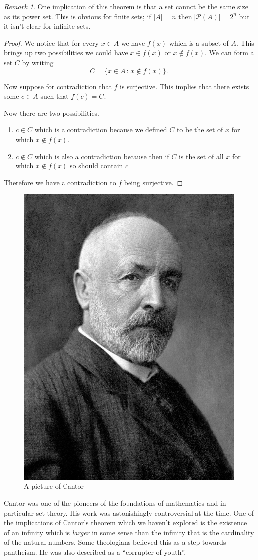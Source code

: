 \documentclass[
]{book}
\theoremstyle{definition}
\theoremstyle{definition}
\theoremstyle{definition}
\theoremstyle{definition}
\theoremstyle{remark}
\newtheorem*{remark}{Remark}
\begin{document}
\begin{remark}
One implication of this theorem is that a set cannot be the same size as its power set. This is obvious for finite sets; if \(|A|=n\) then \(|\mathcal{P}(A)|= 2^n\) but it isn't clear for infinite sets.
\end{remark}

\begin{proof}
We notice that for every \(x \in A\) we have \(f(x)\) which is a subset of \(A\). This brings up two possibilities we could have \(x \in f(x)\) or \(x \notin f(x)\). We can form a set \(C\) by writing
\[ C = \{ x \in A\,:\, x \notin f(x)\}.  \]

Now suppose for contradiction that \(f\) is surjective. This implies that there exists some \(c \in A\) such that \(f(c) = C\).

Now there are two possibilities.

\begin{enumerate}
\def\labelenumi{\arabic{enumi}.}
\item
  \(c \in C\) which is a contradiction because we defined \(C\) to be the set of \(x\) for which \(x \notin f(x)\).
\item
  \(c \notin C\) which is also a contradiction because then if \(C\) is the set of all \(x\) for which \(x \notin f(x)\) so should contain \(c\).
\end{enumerate}

Therefore we have a contradiction to \(f\) being surjective.
\end{proof}

\begin{figure}
\includegraphics[width=0.3\linewidth]{Cantor} \caption{A picture of Cantor}\label{fig:unnamed-chunk-5}
\end{figure}

Cantor was one of the pioneers of the foundations of mathematics and in particular set theory. His work was astonishingly controversial at the time. One of the implications of Cantor's theorem which we haven't explored is the existence of an infinity which is \emph{larger} in some sense than the infinity that is the cardinality of the natural numbers. Some theologians believed this as a step towards pantheism. He was also described as a ``corrupter of youth''.
\end{document}
